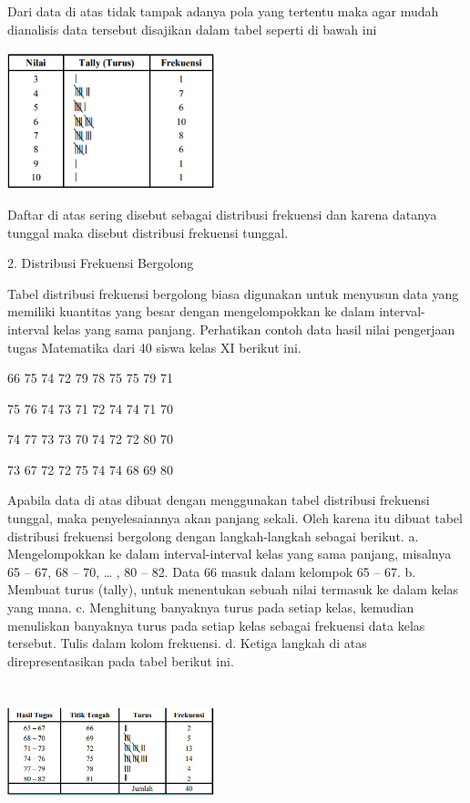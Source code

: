 \documentclass[11pt,fleqn]{book} %
\begin{document}
{Dari data di atas tidak tampak adanya pola yang tertentu maka agar mudah dianalisis
data tersebut disajikan dalam tabel seperti di bawah ini

\includegraphics[width = 6cm, height= 4cm]{Pictures/1reska.png}

Daftar di atas sering disebut sebagai distribusi frekuensi dan karena datanya
tunggal maka disebut distribusi frekuensi tunggal.


2. Distribusi Frekuensi Bergolong

Tabel distribusi frekuensi bergolong biasa digunakan untuk menyusun data yang
memiliki kuantitas yang besar dengan mengelompokkan ke dalam interval-interval kelas
yang sama panjang. Perhatikan contoh data hasil nilai pengerjaan tugas Matematika
dari 40 siswa kelas XI berikut ini.


66 75 74 72 79 78 75 75 79 71

75 76 74 73 71 72 74 74 71 70

74 77 73 73 70 74 72 72 80 70

73 67 72 72 75 74 74 68 69 80



Apabila data di atas dibuat dengan menggunakan tabel distribusi frekuensi tunggal,
maka penyelesaiannya akan panjang sekali. Oleh karena itu dibuat tabel distribusi
frekuensi bergolong dengan langkah-langkah sebagai berikut.
a. Mengelompokkan ke dalam interval-interval kelas yang sama panjang, misalnya
65 – 67, 68 – 70, … , 80 – 82. Data 66 masuk dalam kelompok 65 – 67.
b. Membuat turus (tally), untuk menentukan sebuah nilai termasuk ke dalam kelas
yang mana.
c. Menghitung banyaknya turus pada setiap kelas, kemudian menuliskan banyaknya
turus pada setiap kelas sebagai frekuensi data kelas tersebut. Tulis dalam kolom
frekuensi.
d. Ketiga langkah di atas direpresentasikan pada tabel berikut ini.


\includegraphics[width = 6cm, height= 4cm]{Pictures/2reska.png}

}
\end{document}
